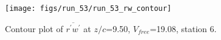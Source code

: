 \begin{figure}[H]
\centering
\texttt{[image: figs/run\_53/run\_53\_rw\_contour]}
\caption{Contour plot of $\overline{r^\prime w^\prime}$ at $z/c$=9.50, $V_{free}$=19.08, station 6.}
\label{fig:run_53_rw_contour}
\end{figure}


